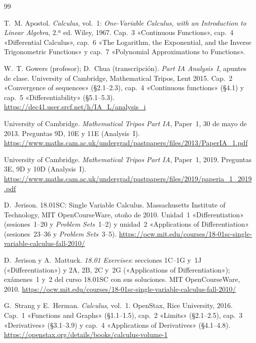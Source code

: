 \begin{thebibliography}{99}
\small

T.~M. Apostol.
\newblock \emph{Calculus}, vol.~1: \emph{One-Variable Calculus, with an Introduction to Linear Algebra}, 2.ª ed.
\newblock Wiley, 1967.
\newblock Cap.~3 «Continuous Functions», cap.~4 «Differential Calculus», cap.~6 «The Logarithm, the Exponential, and the Inverse Trigonometric Functions» y cap.~7 «Polynomial Approximations to Functions».

W.~T. Gowers (profesor); D.~Chua (transcripción).
\newblock \emph{Part IA Analysis~I}, apuntes de clase.
\newblock University of Cambridge, Mathematical Tripos, Lent 2015.
\newblock Cap.~2 «Convergence of sequences» (§2.1--2.3), cap.~4 «Continuous functions» (§4.1) y cap.~5 «Differentiability» (§5.1--5.3).
\newblock \url{https://dec41.user.srcf.net/h/IA_L/analysis_i}

University of Cambridge.
\newblock \emph{Mathematical Tripos Part IA}, Paper~1, 30 de mayo de 2013.
\newblock Preguntas 9D, 10E y 11E (Analysis~I).
\newblock \url{https://www.maths.cam.ac.uk/undergrad/pastpapers/files/2013/PaperIA_1.pdf}

University of Cambridge.
\newblock \emph{Mathematical Tripos Part IA}, Paper~1, 2019.
\newblock Preguntas 3E, 9D y 10D (Analysis~I).
\newblock \url{https://www.maths.cam.ac.uk/undergrad/pastpapers/files/2019/paperia_1_2019.pdf}

D.~Jerison.
\newblock 18.01SC: Single Variable Calculus.
\newblock Massachusetts Institute of Technology, MIT OpenCourseWare, otoño de 2010. Unidad~1 «Differentiation» (sesiones~1--20 y \emph{Problem Sets}~1--2) y unidad~2 «Applications of Differentiation» (sesiones~23--36 y \emph{Problem Sets}~3--5).
\newblock \url{https://ocw.mit.edu/courses/18-01sc-single-variable-calculus-fall-2010/}

D.~Jerison y A.~Mattuck.
\newblock \emph{18.01 Exercises}: secciones 1C--1G y~1J («Differentiation») y 2A, 2B, 2C y~2G («Applications of Differentiation»); exámenes~1 y~2 del curso 18.01SC con sus soluciones.
\newblock MIT OpenCourseWare, 2010.
\newblock \url{https://ocw.mit.edu/courses/18-01sc-single-variable-calculus-fall-2010/}

G.~Strang y E.~Herman.
\newblock \emph{Calculus}, vol.~1.
\newblock OpenStax, Rice University, 2016.
\newblock Cap.~1 «Functions and Graphs» (§1.1--1.5), cap.~2 «Limits» (§2.1--2.5), cap.~3 «Derivatives» (§3.1--3.9) y cap.~4 «Applications of Derivatives» (§4.1--4.8).
\newblock \url{https://openstax.org/details/books/calculus-volume-1}


\end{thebibliography}
